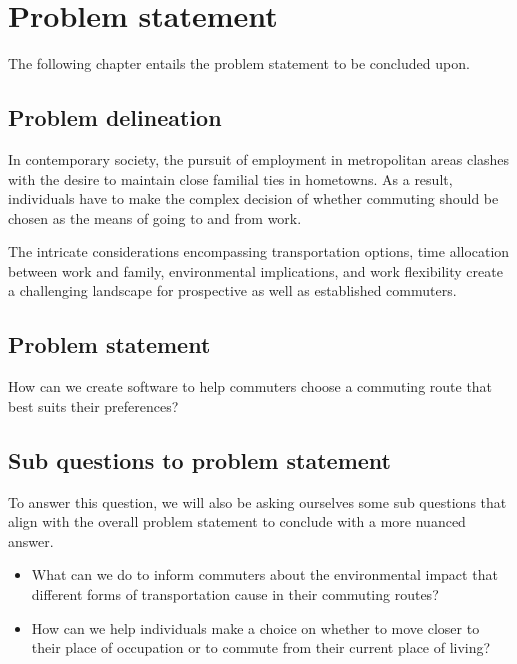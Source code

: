 \chapter{Problem statement}\label{ch:problem-statement}

The following chapter entails the problem statement to be concluded upon.

\section{Problem delineation}\label{sec:problem-delineation}

In contemporary society, the pursuit of employment in metropolitan areas clashes with the desire to maintain close
familial ties in hometowns.
As a result, individuals have to make the complex decision of whether commuting should be chosen as the means of
going to and from work.

The intricate considerations encompassing transportation options, time allocation between work and family, environmental
implications, and work flexibility create a challenging landscape for prospective as well as established commuters.

\section{Problem statement}\label{sec:problem-statement}

How can we create software to help commuters choose a commuting route that best suits their preferences?

\section{Sub questions to problem statement}\label{sec:sub-questions-to-problem-statement}

To answer this question, we will also be asking ourselves some sub questions that align with the overall problem
statement to conclude with a more nuanced answer.

\begin{itemize}
    \item What can we do to inform commuters about the environmental impact that different forms of transportation
    cause in their commuting routes?
    \item How can we help individuals make a choice on whether to move closer to their place of occupation or to commute
    from their current place of living?
\end{itemize}
